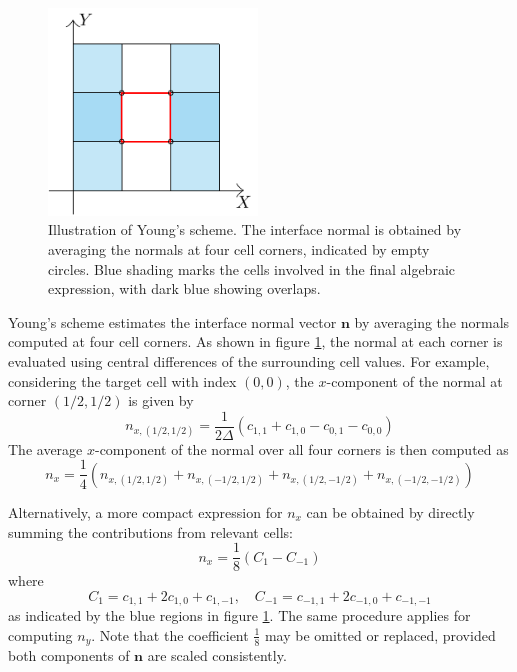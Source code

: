 \begin{figure}[H]
  \centering
  \includegraphics[height=5.5cm]{./image/myc-h-and-myc2d-h/Youngs.pdf}
  \caption{Illustration of Young's scheme. The interface normal is obtained by averaging the normals at four cell corners, indicated by empty circles. Blue shading marks the cells involved in the final algebraic expression, with dark blue showing overlaps.}
  \label{fig:myc-young}
\end{figure}

Young's scheme estimates the interface normal vector $\mathbf{n}$ by averaging the normals computed at four cell corners. As shown in figure \ref{fig:myc-young}, the normal at each corner is evaluated using central differences of the surrounding cell values. For example, considering the target cell with index $(0,0)$, the $x$-component of the normal at corner $(1/2, 1/2)$ is given by
\begin{equation}
  n_{x,(1/2,1/2)} = \frac{1}{2\Delta}\left(c_{1,1} + c_{1,0} - c_{0,1} - c_{0,0}\right)
\end{equation}
The average $x$-component of the normal over all four corners is then computed as
\begin{equation}
  n_x = \frac{1}{4} \left(n_{x,(1/2,1/2)} + n_{x,(-1/2,1/2)} + n_{x,(1/2,-1/2)} + n_{x,(-1/2,-1/2)} \right)
\end{equation}

Alternatively, a more compact expression for $n_x$ can be obtained by directly summing the contributions from relevant cells:
\begin{equation}
  n_x = \frac{1}{8} \left(C_1 - C_{-1}\right)
\end{equation}
where
\begin{equation}\label{equ:myc-youngs}
  C_1 = c_{1,1} + 2c_{1,0} + c_{1,-1}, \quad C_{-1} = c_{-1,1} + 2c_{-1,0} + c_{-1,-1}
\end{equation}
as indicated by the blue regions in figure \ref{fig:myc-young}. The same procedure applies for computing $n_y$. Note that the coefficient $\frac{1}{8}$ may be omitted or replaced, provided both components of $\mathbf{n}$ are scaled consistently.

